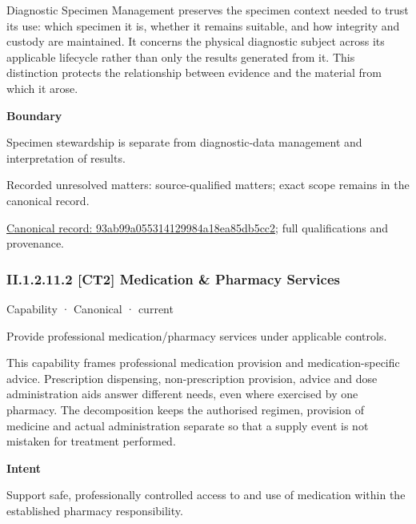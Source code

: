 Diagnostic Specimen Management preserves the specimen context needed to trust its use: which specimen it is, whether it remains suitable, and how integrity and custody are maintained. It concerns the physical diagnostic subject across its applicable lifecycle rather than only the results generated from it. This distinction protects the relationship between evidence and the material from which it arose.



\textbf{Boundary}



Specimen stewardship is separate from diagnostic-data management and interpretation of results.


{\small Recorded unresolved matters: source-qualified matters; exact scope remains in the canonical record.}\par
{\footnotesize \href{../../../../continuum/strategy/capability/93ab99a055314129984a18ea85db5cc2.md}{Canonical record: 93ab99a055314129984a18ea85db5cc2}; full qualifications and provenance.}\par
\subsubsection*{II.1.2.11.2 [CT2] Medication \& Pharmacy Services}
\label{navigation:II.1.2.11.2}

\label{element:ab2a4e6a7acc4868bc4e7b6c0d292cb4}
{\small Capability · Canonical · current}\par

Provide professional medication/pharmacy services under applicable controls.



This capability frames professional medication provision and medication-specific advice. Prescription dispensing, non-prescription provision, advice and dose administration aids answer different needs, even where exercised by one pharmacy. The decomposition keeps the authorised regimen, provision of medicine and actual administration separate so that a supply event is not mistaken for treatment performed.



\textbf{Intent}



Support safe, professionally controlled access to and use of medication within the established pharmacy responsibility.



